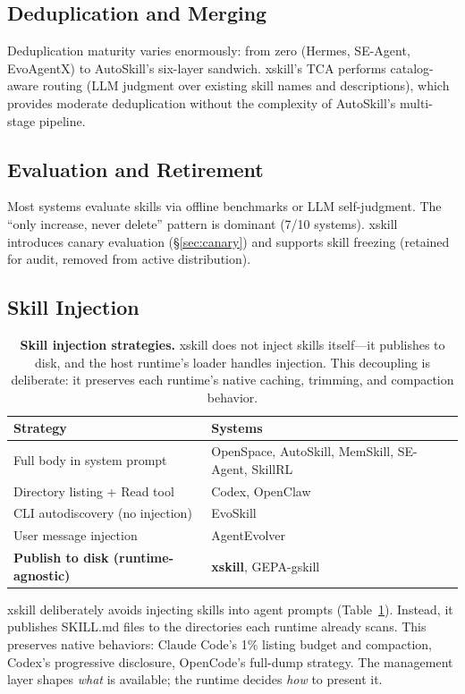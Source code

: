 \documentclass[11pt]{article}
\begin{document}
\subsection{Deduplication and Merging}

Deduplication maturity varies enormously: from zero (Hermes, SE-Agent, EvoAgentX) to AutoSkill's six-layer sandwich. xskill's TCA performs catalog-aware routing (LLM judgment over existing skill names and descriptions), which provides moderate deduplication without the complexity of AutoSkill's multi-stage pipeline.

\subsection{Evaluation and Retirement}

Most systems evaluate skills via offline benchmarks or LLM self-judgment. The ``only increase, never delete'' pattern is dominant (7/10 systems). xskill introduces canary evaluation (\S\ref{sec:canary}) and supports skill freezing (retained for audit, removed from active distribution).

\subsection{Skill Injection}

\begin{table}[t]
\centering
\caption{\textbf{Skill injection strategies.} xskill does not inject skills itself---it publishes to disk, and the host runtime's loader handles injection. This decoupling is deliberate: it preserves each runtime's native caching, trimming, and compaction behavior.}
\label{tab:injection}
\small
\begin{tabular}{@{}ll@{}}
\toprule
\textbf{Strategy} & \textbf{Systems} \\
\midrule
Full body in system prompt & OpenSpace, AutoSkill, MemSkill, SE-Agent, SkillRL \\
Directory listing + Read tool & Codex, OpenClaw \\
CLI autodiscovery (no injection) & EvoSkill \\
User message injection & AgentEvolver \\
\textbf{Publish to disk (runtime-agnostic)} & \textbf{xskill}, GEPA-gskill \\
\bottomrule
\end{tabular}
\end{table}

xskill deliberately avoids injecting skills into agent prompts (Table~\ref{tab:injection}). Instead, it publishes SKILL.md files to the directories each runtime already scans. This preserves native behaviors: Claude Code's 1\% listing budget and compaction, Codex's progressive disclosure, OpenCode's full-dump strategy. The management layer shapes \emph{what} is available; the runtime decides \emph{how} to present it.
\end{document}
